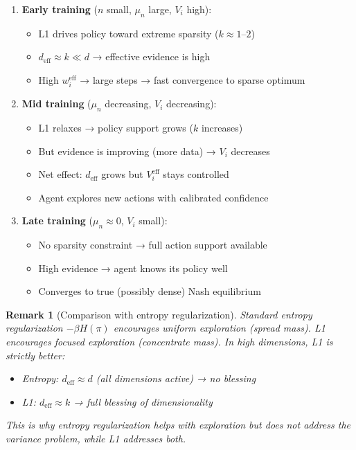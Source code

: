 \documentclass[11pt,a4paper]{article}
\newtheorem{remark}[theorem]{Remark}
\begin{document}
\begin{enumerate}
  \item \textbf{Early training} ($n$ small, $\mu_n$ large, $V_i$ high):
    \begin{itemize}
      \item L1 drives policy toward extreme sparsity ($k \approx 1$--$2$)
      \item $d_{\text{eff}} \approx k \ll d$ → effective evidence is high
      \item High $w_i^{\text{eff}}$ → large steps → fast convergence to sparse optimum
    \end{itemize}

  \item \textbf{Mid training} ($\mu_n$ decreasing, $V_i$ decreasing):
    \begin{itemize}
      \item L1 relaxes → policy support grows ($k$ increases)
      \item But evidence is improving (more data) → $V_i$ decreases
      \item Net effect: $d_{\text{eff}}$ grows but $V_i^{\text{eff}}$ stays controlled
      \item Agent explores new actions with calibrated confidence
    \end{itemize}

  \item \textbf{Late training} ($\mu_n \approx 0$, $V_i$ small):
    \begin{itemize}
      \item No sparsity constraint → full action support available
      \item High evidence → agent knows its policy well
      \item Converges to true (possibly dense) Nash equilibrium
    \end{itemize}
\end{enumerate}

\begin{remark}[Comparison with entropy regularization]
Standard entropy regularization $-\beta H(\pi)$ encourages \emph{uniform}
exploration (spread mass). L1 encourages \emph{focused} exploration
(concentrate mass). In high dimensions, L1 is strictly better:
\begin{itemize}
  \item Entropy: $d_{\text{eff}} \approx d$ (all dimensions active) → no blessing
  \item L1: $d_{\text{eff}} \approx k$ → full blessing of dimensionality
\end{itemize}
This is why entropy regularization helps with exploration but
\emph{does not} address the variance problem, while L1 addresses both.
\end{remark}
\end{document}

